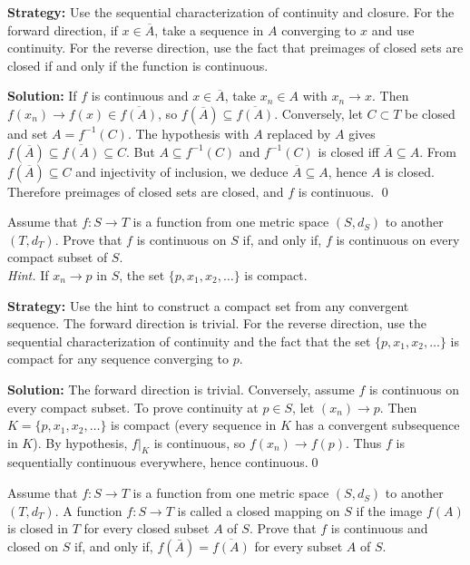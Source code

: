 \noindent\textbf{Strategy:} Use the sequential characterization of continuity and closure. For the forward direction, if $x \in \overline{A}$, take a sequence in $A$ converging to $x$ and use continuity. For the reverse direction, use the fact that preimages of closed sets are closed if and only if the function is continuous.

\bigskip\noindent\textbf{Solution:}
If $f$ is continuous and $x\in\overline{A}$, take $x_n\in A$ with $x_n\to x$. Then $f(x_n)\to f(x)\in\overline{f(A)}$, so $f(\overline{A})\subseteq\overline{f(A)}$. Conversely, let $C\subset T$ be closed and set $A=f^{-1}(C)$. The hypothesis with $A$ replaced by $A$ gives $f(\overline{A})\subseteq\overline{f(A)}\subseteq C$. But $A\subseteq f^{-1}(C)$ and $f^{-1}(C)$ is closed iff $\overline{A}\subseteq A$. From $f(\overline{A})\subseteq C$ and injectivity of inclusion, we deduce $\overline{A}\subseteq A$, hence $A$ is closed. Therefore preimages of closed sets are closed, and $f$ is continuous. \qed



\begin{problembox}
Assume that $f : S \rightarrow T$ is a function from one metric space $(S, d_S)$ to another $(T, d_T)$. Prove that $f$ is continuous on $S$ if, and only if, $f$ is continuous on every compact subset of $S$. \\
\textit{Hint.} If $x_n \rightarrow p$ in $S$, the set $\{p, x_1, x_2, \ldots\}$ is compact.
\end{problembox}

\noindent\textbf{Strategy:} Use the hint to construct a compact set from any convergent sequence. The forward direction is trivial. For the reverse direction, use the sequential characterization of continuity and the fact that the set $\{p, x_1, x_2, \ldots\}$ is compact for any sequence converging to $p$.

\bigskip\noindent\textbf{Solution:}
The forward direction is trivial. Conversely, assume $f$ is continuous on every compact subset. To prove continuity at $p\in S$, let $(x_n)\to p$. Then $K=\{p,x_1,x_2,\ldots\}$ is compact (every sequence in $K$ has a convergent subsequence in $K$). By hypothesis, $f|_K$ is continuous, so $f(x_n)\to f(p)$. Thus $f$ is sequentially continuous everywhere, hence continuous.\qed



\begin{problembox}
Assume that $f : S \rightarrow T$ is a function from one metric space $(S, d_S)$ to another $(T, d_T)$. A function $f : S \rightarrow T$ is called a closed mapping on $S$ if the image $f(A)$ is closed in $T$ for every closed subset $A$ of $S$. Prove that $f$ is continuous and closed on $S$ if, and only if, $f(\bar{A}) = \overline{f(A)}$ for every subset $A$ of $S$.
\end{problembox}

